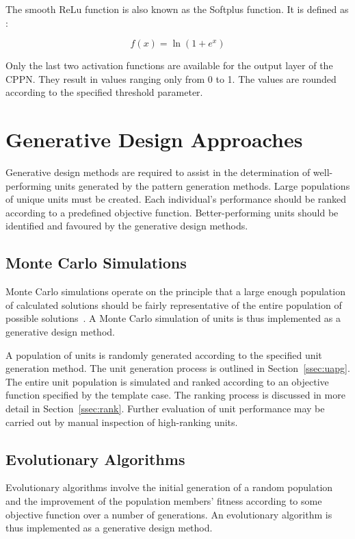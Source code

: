 The smooth ReLu function is also known as the Softplus function. It is defined as \citep{Dugas2001}:

\begin{equation}
	f\left ( x \right )=\ln \left ( 1+e^{x} \right )
\end{equation}

Only the last two activation functions are available for the output layer of the CPPN. They result in values ranging only from 0 to 1. The values are rounded according to the specified threshold parameter.

\section{Generative Design Approaches}
\label{sec:GD}

Generative design methods are required to assist in the determination of well-performing units generated by the pattern generation methods. Large populations of unique units must be created. Each individual's performance should be ranked according to a predefined objective function. Better-performing units should be identified and favoured by the generative design methods.

\subsection{Monte Carlo Simulations}

Monte Carlo simulations operate on the principle that a large enough population of calculated solutions should be fairly representative of the entire population of possible solutions~\citep{Metropolis1949}. A Monte Carlo simulation of units is thus implemented as a generative design method.

A population of units is randomly generated according to the specified unit generation method. The unit generation process is outlined in Section~\ref{ssec:uapg}. The entire unit population is simulated and ranked according to an objective function specified by the template case. The ranking process is discussed in more detail in Section~\ref{ssec:rank}. Further evaluation of unit performance may be carried out by manual inspection of high-ranking units.

\subsection{Evolutionary Algorithms}
\label{ssec:ea}

Evolutionary algorithms involve the initial generation of a random population and the improvement of the population members' fitness according to some objective function over a number of generations. An evolutionary algorithm is thus implemented as a generative design method.


